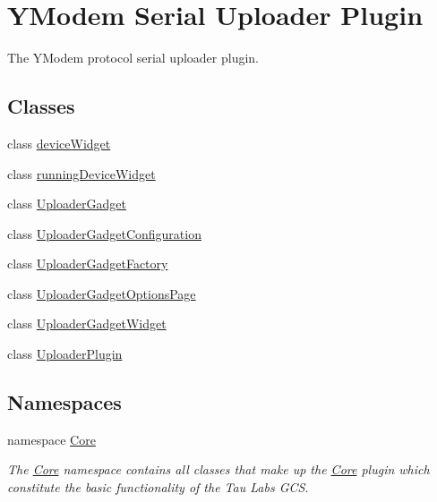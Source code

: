 \hypertarget{group___y_modem_uploader}{\section{\-Y\-Modem \-Serial \-Uploader \-Plugin}
\label{group___y_modem_uploader}
}


\-The \-Y\-Modem protocol serial uploader plugin.  


\subsection*{\-Classes}
\begin{DoxyCompactItemize}
\item 
class \hyperlink{classdevice_widget}{device\-Widget}
\item 
class \hyperlink{classrunning_device_widget}{running\-Device\-Widget}
\item 
class \hyperlink{class_uploader_gadget}{\-Uploader\-Gadget}
\item 
class \hyperlink{class_uploader_gadget_configuration}{\-Uploader\-Gadget\-Configuration}
\item 
class \hyperlink{class_uploader_gadget_factory}{\-Uploader\-Gadget\-Factory}
\item 
class \hyperlink{class_uploader_gadget_options_page}{\-Uploader\-Gadget\-Options\-Page}
\item 
class \hyperlink{class_uploader_gadget_widget}{\-Uploader\-Gadget\-Widget}
\item 
class \hyperlink{class_uploader_plugin}{\-Uploader\-Plugin}
\end{DoxyCompactItemize}
\subsection*{\-Namespaces}
\begin{DoxyCompactItemize}
\item 
namespace \hyperlink{namespace_core}{\-Core}
\begin{DoxyCompactList}\small\item\em \-The \hyperlink{namespace_core}{\-Core} namespace contains all classes that make up the \hyperlink{namespace_core}{\-Core} plugin which constitute the basic functionality of the \-Tau \-Labs \-G\-C\-S. \end{DoxyCompactList}\end{DoxyCompactItemize}
